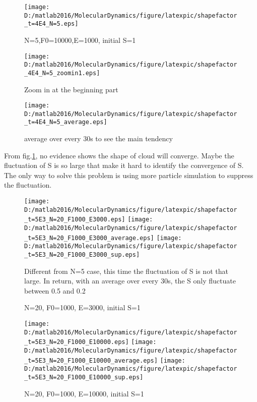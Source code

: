 \documentclass[aps,pre,twocolumn
,groupedaddress]{revtex4-1}
\begin{document}
\begin{figure}[hbtp]

\centering
\texttt{[image: D:/matlab2016/MolecularDynamics/figure/latexpic/shapefactor\_t=4E4\_N=5.eps]}
\caption{N=5,F0=10000,E=1000, initial S=1}
\end{figure}
\begin{figure}[hbtp]
\centering
\texttt{[image: D:/matlab2016/MolecularDynamics/figure/latexpic/shapefactor\_4E4\_N=5\_zoomin1.eps]} 
\caption{Zoom in at the beginning part}
\end{figure}
\begin{figure}[hbtp]
\centering
\texttt{[image: D:/matlab2016/MolecularDynamics/figure/latexpic/shapefactor\_t=4E4\_N=5\_average.eps]}
\caption{average over every 30s to see the main tendency}
\label{fig:relaxationPS1}
\end{figure}


From fig.\ref{fig:relaxationPS1}, no evidence shows the shape of cloud will converge. Maybe the fluctuation of S is so large that make it hard to identify the convergence of S. The only way to solve this problem is using more particle simulation to suppress the fluctuation.

\begin{figure}
\centering
\texttt{[image: D:/matlab2016/MolecularDynamics/figure/latexpic/shapefactor\_t=5E3\_N=20\_F1000\_E3000.eps]} 
\texttt{[image: D:/matlab2016/MolecularDynamics/figure/latexpic/shapefactor\_t=5E3\_N=20\_F1000\_E3000\_average.eps]}
\texttt{[image: D:/matlab2016/MolecularDynamics/figure/latexpic/shapefactor\_t=5E3\_N=20\_F1000\_E3000\_sup.eps]}
\caption{N=20, F0=1000, E=3000, initial S=1}
\begin{flushleft}
Different from N=5 case, this time the fluctuation of S is not that large. In return, with an average over every 30s, the S only fluctuate between 0.5 and 0.2
\end{flushleft}
\label{fig:relaxationPS2}
\end{figure}
\begin{figure}
\centering
\texttt{[image: D:/matlab2016/MolecularDynamics/figure/latexpic/shapefactor\_t=5E3\_N=20\_F1000\_E10000.eps]} 
\texttt{[image: D:/matlab2016/MolecularDynamics/figure/latexpic/shapefactor\_t=5E3\_N=20\_F1000\_E10000\_average.eps]}
\texttt{[image: D:/matlab2016/MolecularDynamics/figure/latexpic/shapefactor\_t=5E3\_N=20\_F1000\_E10000\_sup.eps]}
\caption{N=20, F0=1000, E=10000, initial S=1}
\label{fig:relaxationPS3}
\end{figure}
\end{document}
